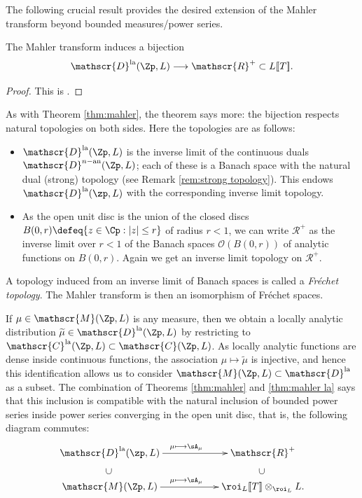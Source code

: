 \documentclass[a4paper,10pt, english, reqno]{smfart}
\makeatletter
\newcommand{\lsem}{[\! [}
\newcommand{\rsem}{]\! ]}
\newcommand{\sD}{\mathscr{D}}
\newcommand{\sar}[2]{\ar@{}[#1]|-*[@]{#2}}
\newcommand{\sM}{\mathscr{M}}
\newcommand{\sC}{\mathscr{C}}
\numberwithin{equation}{section}
\makeatother
\begin{document}
The following crucial result provides the desired extension of the Mahler transform beyond bounded measures/power series.

\begin{theorem}\label{thm:mahler la}
The Mahler transform induces a bijection
\[
    \sD^{\mathrm{la}}(\Zp,L) \longrightarrow \mathscr{R}^+ \subset L\lsem T \rsem.
\]
\end{theorem}
\begin{proof}
This is \cite[Thm.\ II.2.2]{Colm10}.
\end{proof}

As with Theorem \ref{thm:mahler}, the theorem says more: the bijection respects natural topologies on both sides. Here the topologies are as follows:
\begin{itemize}
\item $\sD^{\mathrm{la}}(\Zp,L)$ is the inverse limit of the continuous duals $\sD^{n-\mathrm{an}}(\Zp,L)$; each of these is a Banach space with the natural dual (strong) topology (see Remark \ref{rem:strong topology}). This endows $\sD^{\mathrm{la}}(\zp,L)$ with the corresponding inverse limit topology. 
\item As the open unit disc is the union of the closed discs $ B(0, r) \defeq \{ z \in \Cp : |z| \leq r \}$ of radius $r < 1$, we can write $\mathscr{R}^{+}$ as the inverse limit over $r < 1$ of the Banach spaces $\mathcal{O}(B(0, r))$ of analytic functions on $B(0, r)$. Again we get an inverse limit topology on $\mathscr{R}^+$. 
\end{itemize}
A topology induced from an inverse limit of Banach spaces is called a \emph{Fr\'echet topology}. The Mahler transform is then an isomorphism of Fr\'echet spaces.

\begin{remark}
If $\mu \in \sM(\Zp,L)$ is any measure, then we obtain a locally analytic distribution $\widetilde{\mu} \in \sD^{\mathrm{la}}(\Zp,L)$ by restricting to $\sC^{\mathrm{la}}(\Zp,L) \subset \sC(\Zp,L)$. As locally analytic functions are dense inside continuous functions, the association $\mu \mapsto \widetilde{\mu}$ is injective, and hence this identification allows us to consider $\sM(\Zp,L) \subset \sD^{\mathrm{la}}$ as a subset. The combination of Theorems \ref{thm:mahler} and \ref{thm:mahler la} says that this inclusion is compatible with the natural inclusion of bounded power series inside power series converging in the open unit disc, that is, the following diagram commutes:
\begin{equation}\label{eq:extend mahler}
\xymatrix@C=20mm@R=6mm{
\mathscr{D}^{\mathrm{la}}(\zp,L)\sar{d}{\supset} \ar[r]^{\mu \longmapsto \sA_\mu} & \mathscr{R}^+\sar{d}{\supset}\\
\sM(\Zp,L) \ar[r]^{\mu \longmapsto \sA_\mu} & \roi_L\lsem T\rsem \otimes_{\roi_L} L.
}
\end{equation}
\end{remark}
\end{document}
